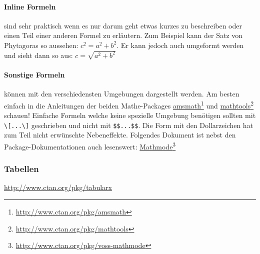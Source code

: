 \paragraph{Inline Formeln}
sind sehr praktisch wenn es nur darum geht etwas kurzes zu beschreiben oder einen Teil
einer anderen Formel zu erläutern. Zum Beispiel kann der Satz von Phytagoras so aussehen: $c^2 = a^2 + b^2$. Er kann jedoch auch
umgeformt werden und sieht dann so aus: $c=\sqrt{a^2 + b^2}$

\paragraph{Sonstige Formeln}
können mit den verschiedensten Umgebungen dargestellt werden. Am besten einfach in die Anleitungen der beiden Mathe-Packages
\href{http://www.ctan.org/pkg/amsmath}{amsmath}\footnote{\url{http://www.ctan.org/pkg/amsmath}} und 
\href{http://www.ctan.org/pkg/mathtools}{mathtools}\footnote{\url{http://www.ctan.org/pkg/mathtools}} schauen!
Einfache Formeln welche keine spezielle Umgebung benötigen sollten mit \verb+\[...\]+ geschrieben und nicht mit
\verb+$$...$$+. Die Form mit den Dollarzeichen hat zum Teil nicht erwünschte Nebeneffekte.
Folgendes Dokument ist nebst den Package-Dokumentationen auch lesenswert: 
\href{http://www.ctan.org/pkg/voss-mathmode}{Mathmode}\footnote{\url{http://www.ctan.org/pkg/voss-mathmode}}

\subsubsection{Tabellen}
\url{http://www.ctan.org/pkg/tabularx}
